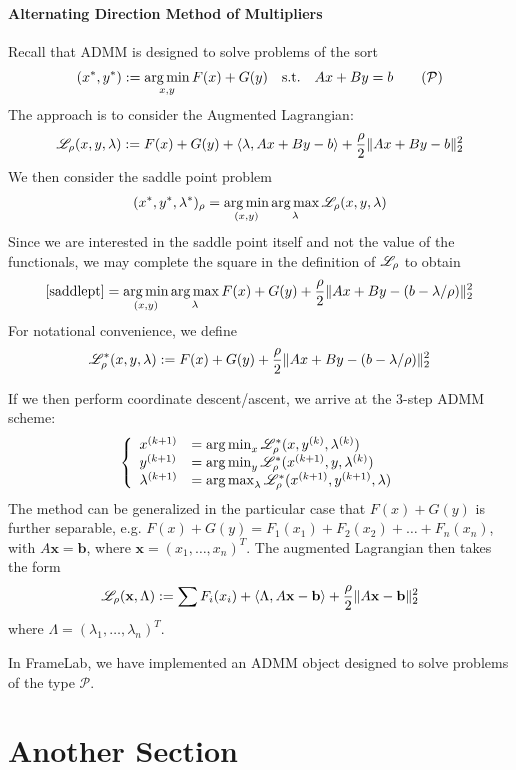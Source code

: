 \documentclass[12pt]{article}
\begin{document}
\paragraph{Alternating Direction Method of Multipliers}
Recall that ADMM is designed to solve problems of the sort 
\begin{align}
(x^*,y^*) : = \argmin_{x,y} F(x)+G(y)\quad \st\quad  Ax+By = b \tag{$\mathcal{P}$}
\end{align} The approach is to consider the Augmented Lagrangian: 
\begin{align*}
\mathscr{L}_\rho(x,y,\lambda) : = F(x)+G(y) + \left\langle \lambda, Ax+By-b\right \rangle +\frac{\rho}{2}\|Ax+By-b\|_2^2
\end{align*} We then consider the saddle point problem 
\begin{align}
(x^*,y^*,\lambda^*)_\rho = \operatorname*{arg\, min}_{(x,y)}\operatorname*{arg\, max}_\lambda \mathscr{L}_\rho(x,y,\lambda)\label{saddlept} 
\end{align}  Since we are interested in the saddle point itself and not the value of the functionals, we may complete the square in the definition of $\mathscr{L}_\rho$ to obtain 
\begin{align*}
\eqref{saddlept} = \operatorname*{arg\, min}_{(x,y)}\operatorname*{arg\, max}_\lambda F(x) + G(y) +\frac{\rho}{2}\|Ax+By-(b-\lambda/\rho)\|_2^2
\end{align*}For notational convenience, we define
\begin{align*}
\mathscr{L}_\rho^*(x,y,\lambda): =  F(x) + G(y) +\frac{\rho}{2}\|Ax+By-(b-\lambda/\rho)\|_2^2
\end{align*}

 If we then perform coordinate descent/ascent, we arrive at the 3-step ADMM scheme: 
\begin{align*}
\left\{\begin{array}{ll}
x^{(k+1)} &= \operatorname*{arg\, min}_x \mathscr{L}_\rho^*(x,y^{(k)},\lambda^{(k)}) \\
y^{(k+1)} &= \operatorname*{arg\, min}_y \mathscr{L}_\rho^*(x^{(k+1)},y,\lambda^{(k)})\\
\lambda^{(k+1)} &= \operatorname*{arg\, max}_\lambda \mathscr{L}_{\rho}^*(x^{(k+1)},y^{(k+1)},\lambda)
\end{array}\right. 
\end{align*} The method can be generalized in the particular case that $F(x)+G(y)$ is further separable, e.g. $F(x)+G(y) = F_1(x_1)+F_2(x_2)+\ldots+F_n(x_n)$, with $A\textbf{x}=\textbf{b}$, where $\textbf{x} = (x_1,\ldots,x_n)^T$.  The augmented Lagrangian then takes the form 
\begin{align*}
\mathscr{L}_\rho (\textbf{x},\Lambda) : = \sum F_i(x_i) + \left\langle \Lambda,A\textbf{x}-\textbf{b}\right\rangle +\frac{\rho}{2}\|A\textbf{x}-\textbf{b}\|_2^2 
\end{align*} where $\Lambda = (\lambda_1,\ldots,\lambda_n)^T$. 

In FrameLab, we have implemented an ADMM object designed to solve problems of the type $\mathcal{P}$.
\section{Another Section}
\end{document}
